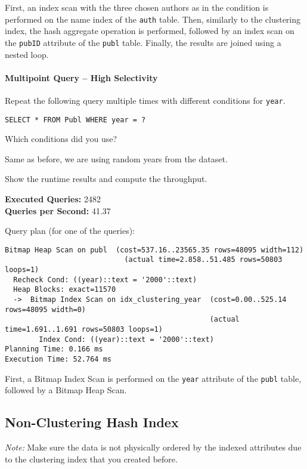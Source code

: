\documentclass[11pt]{scrartcl}
\begin{document}
First, an index scan with the three chosen authors as in the condition is performed on the name index of the \texttt{auth}
table.
Then, similarly to the clustering index, the hash aggregate operation is performed, followed by an index scan on the
\texttt{pubID} attribute of the \texttt{publ} table.
Finally, the results are joined using a nested loop.

\paragraph{Multipoint Query -- High Selectivity}

Repeat the following query multiple times with different conditions for \texttt{year}.

\begin{lstlisting}[style=dbtsql]
SELECT * FROM Publ WHERE year = ?
\end{lstlisting}

Which conditions did you use?

Same as before, we are using random years from the dataset.

Show the runtime results and compute the throughput.

\textbf{Executed Queries: } 2482\\
\textbf{Queries per Second: } 41.37

Query plan (for one of the queries):

{\small
\parskip0pt\begin{verbatim}
Bitmap Heap Scan on publ  (cost=537.16..23565.35 rows=48095 width=112)
                            (actual time=2.858..51.485 rows=50803 loops=1)
  Recheck Cond: ((year)::text = '2000'::text)
  Heap Blocks: exact=11570
  ->  Bitmap Index Scan on idx_clustering_year  (cost=0.00..525.14 rows=48095 width=0)
                                                (actual time=1.691..1.691 rows=50803 loops=1)
        Index Cond: ((year)::text = '2000'::text)
Planning Time: 0.166 ms
Execution Time: 52.764 ms
\end{verbatim}}

First, a Bitmap Index Scan is performed on the \texttt{year} attribute of the \texttt{publ} table, followed by a Bitmap
Heap Scan.

\subsection*{Non-Clustering Hash Index}

\emph{Note:} Make sure the data is not physically ordered by the indexed attributes due to the clustering index that you created before.
\end{document}

